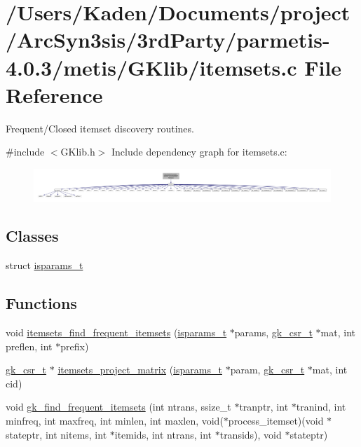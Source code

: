 \hypertarget{a00104}{}\section{/\+Users/\+Kaden/\+Documents/project/\+Arc\+Syn3sis/3rd\+Party/parmetis-\/4.0.3/metis/\+G\+Klib/itemsets.c File Reference}
\label{a00104}


Frequent/\+Closed itemset discovery routines.  


{\ttfamily \#include $<$G\+Klib.\+h$>$}\newline
Include dependency graph for itemsets.\+c\+:\nopagebreak
\begin{figure}[H]
\begin{center}
\leavevmode
\includegraphics[width=350pt]{a00105}
\end{center}
\end{figure}
\subsection*{Classes}
\begin{DoxyCompactItemize}
\item 
struct \hyperlink{a00698}{isparams\+\_\+t}
\end{DoxyCompactItemize}
\subsection*{Functions}
\begin{DoxyCompactItemize}
\item 
void \hyperlink{a00104_ab19ae99e1e3ba575373cf0fe846a8cd9}{itemsets\+\_\+find\+\_\+frequent\+\_\+itemsets} (\hyperlink{a00698}{isparams\+\_\+t} $\ast$params, \hyperlink{a00634}{gk\+\_\+csr\+\_\+t} $\ast$mat, int preflen, int $\ast$prefix)
\item 
\hyperlink{a00634}{gk\+\_\+csr\+\_\+t} $\ast$ \hyperlink{a00104_ab348ad8f89d70692400d7602e3a824bf}{itemsets\+\_\+project\+\_\+matrix} (\hyperlink{a00698}{isparams\+\_\+t} $\ast$param, \hyperlink{a00634}{gk\+\_\+csr\+\_\+t} $\ast$mat, int cid)
\item 
void \hyperlink{a00104_abc9e8f6a3efe2f0f3ec79b5d8883b246}{gk\+\_\+find\+\_\+frequent\+\_\+itemsets} (int ntrans, ssize\+\_\+t $\ast$tranptr, int $\ast$tranind, int minfreq, int maxfreq, int minlen, int maxlen, void($\ast$process\+\_\+itemset)(void $\ast$stateptr, int nitems, int $\ast$itemids, int ntrans, int $\ast$transids), void $\ast$stateptr)
\end{DoxyCompactItemize}


